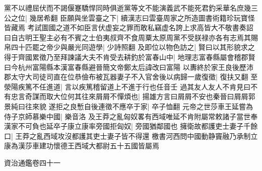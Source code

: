 黨不以禮屈伏而不謁偃蹇驕悍同時俱逝黨等文不能演義武不能死君釣采華名庶幾三公之位|{
	幾居希翻}
臣願與坐雲臺之下|{
	續漢志曰雲臺周家之所造圖書術籍珍玩寶怪皆藏焉}
考試圖國之道不如臣言伏虚妄之罪而敢私竊虚名誇上求高皆大不敬書奏詔曰自古明王聖主必有不賓之士伯夷叔齊不食周粟太原周黨不受朕禄亦各有志焉其賜帛四十匹罷之帝少與嚴光同遊學|{
	少詩照翻}
及即位以物色訪之|{
	賢曰以其形貌求之}
得于齊國累徵乃至拜諫議大夫不肯受去耕釣於富春山中|{
	地理志富春縣屬會稽郡賢曰今杭州富陽縣本漢富春縣避晉簡文帝鄭太后諱改曰富陽}
以夀終於家王良後歷沛郡太守大司徒司直在位恭儉布被瓦器妻子不入官舍後以病歸一歲復徵|{
	復扶又翻}
至滎陽疾篤不任進道|{
	言以疾篤稽留道上不進于行也任音壬}
過其友人友人不肯見曰不有忠言奇謀而取大位何其往來屑屑不憚煩也|{
	揚雄方言曰屑屑不安也秦晉曰屑屑郭景純曰往來貌}
遂拒之良慙自後連徵不應卒于家|{
	卒子恤翻}
元帝之世莎車王延嘗為侍子京師慕樂中國|{
	樂音洛}
及王莽之亂匈奴畧有西域唯延不肯附屬常敕諸子當世奉漢家不可負也延卒子康立康率旁國拒匈奴|{
	旁國猶鄰國也}
擁衛故都護吏士妻子千餘口|{
	王莽之亂西域攻沒都護其吏士妻子皆不得還}
檄書河西問中國動静竇融乃承制立康為漢莎車建功懷德王西域大都尉五十五國皆屬焉

資治通鑑卷四十一
